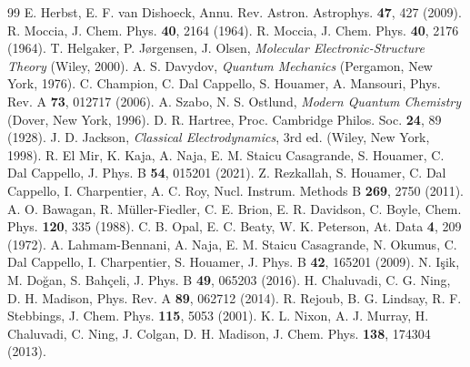 \documentclass[11pt,a4paper]{article}
\begin{document}
\begin{thebibliography}{99}
 E. Herbst, E. F. van Dishoeck, Annu. Rev. Astron. Astrophys. \textbf{47}, 427 (2009).
 R. Moccia, J. Chem. Phys. \textbf{40}, 2164 (1964).
 R. Moccia, J. Chem. Phys. \textbf{40}, 2176 (1964).
 T. Helgaker, P. J{\o}rgensen, J. Olsen, \emph{Molecular Electronic-Structure Theory} (Wiley, 2000).
 A. S. Davydov, \emph{Quantum Mechanics} (Pergamon, New York, 1976).
 C. Champion, C. Dal Cappello, S. Houamer, A. Mansouri, Phys. Rev. A \textbf{73}, 012717 (2006).
 A. Szabo, N. S. Ostlund, \emph{Modern Quantum Chemistry} (Dover, New York, 1996).
 D. R. Hartree, Proc. Cambridge Philos. Soc. \textbf{24}, 89 (1928).
 J. D. Jackson, \emph{Classical Electrodynamics}, 3rd ed. (Wiley, New York, 1998).
 R. El Mir, K. Kaja, A. Naja, E. M. Staicu Casagrande, S. Houamer, C. Dal Cappello, J. Phys. B \textbf{54}, 015201 (2021).
 Z. Rezkallah, S. Houamer, C. Dal Cappello, I. Charpentier, A. C. Roy, Nucl. Instrum. Methods B \textbf{269}, 2750 (2011).
 A. O. Bawagan, R. M\"uller-Fiedler, C. E. Brion, E. R. Davidson, C. Boyle, Chem. Phys. \textbf{120}, 335 (1988).
 C. B. Opal, E. C. Beaty, W. K. Peterson, At. Data \textbf{4}, 209 (1972).
 A. Lahmam-Bennani, A. Naja, E. M. Staicu Casagrande, N. Okumus, C. Dal Cappello, I. Charpentier, S. Houamer, J. Phys. B \textbf{42}, 165201 (2009).
 N. I\c{s}ik, M. Do\u{g}an, S. Bah\c{c}eli, J. Phys. B \textbf{49}, 065203 (2016).
 H. Chaluvadi, C. G. Ning, D. H. Madison, Phys. Rev. A \textbf{89}, 062712 (2014).
 R. Rejoub, B. G. Lindsay, R. F. Stebbings, J. Chem. Phys. \textbf{115}, 5053 (2001).
 K. L. Nixon, A. J. Murray, H. Chaluvadi, C. Ning, J. Colgan, D. H. Madison, J. Chem. Phys. \textbf{138}, 174304 (2013).
\end{thebibliography}
\end{document}
